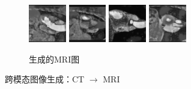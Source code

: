 \begin{figure}
\begin{subfigure}{\textwidth}
        \includegraphics[width=0.18\textwidth]{image/chap04/seg/1_150fake_mr.png}
        \includegraphics[width=0.18\textwidth]{image/chap04/seg/1_185fake_mr.png}
        \includegraphics[width=0.18\textwidth]{image/chap04/seg/2_156fake_mr.png}
        \includegraphics[width=0.18\textwidth]{image/chap04/seg/3_150fake_mr.png}
        \caption{生成的MRI图}
        \label{fig:fake_mri}
    \end{subfigure}
    \caption{跨模态图像生成：CT $\rightarrow$ MRI}
    \label{fig:synthesis}
    \end{figure}

